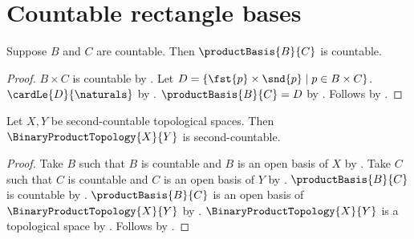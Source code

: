 \section{Countable rectangle bases}




\begin{theorem}\label{product_of_countable_bases_is_countable}
    Suppose $B$ and $C$ are countable.
    Then $\productBasis{B}{C}$ is countable.
\end{theorem}
\begin{proof}
    $B\times C$ is countable by .
    Let $D=\{\fst{p}\times\snd{p}\mid p\in B\times C\}$.
    $\cardLe{D}{\naturals}$ by .
    $\productBasis{B}{C}=D$ by .
    Follows by .
\end{proof}

\begin{theorem}\label{binary_product_of_second_countable_spaces}
    Let $X,Y$ be second-countable topological spaces.
    Then $\BinaryProductTopology{X}{Y}$ is second-countable.
\end{theorem}
\begin{proof}
    Take $B$ such that $B$ is countable and $B$ is an open basis of $X$
        by .
    Take $C$ such that $C$ is countable and $C$ is an open basis of $Y$
        by .
    $\productBasis{B}{C}$ is countable by .
    $\productBasis{B}{C}$ is an open basis of $\BinaryProductTopology{X}{Y}$
        by .
    $\BinaryProductTopology{X}{Y}$ is a topological space by
        .
    Follows by .
\end{proof}
